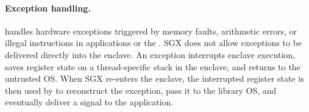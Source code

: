




\paragraph{Exception handling.}
\graphenesgx{} handles hardware exceptions triggered by memory faults, arithmetic errors, or illegal instructions in applications or the \libos{}.
SGX does not allow exceptions to be delivered directly into the enclave.
An exception interrupts enclave execution, 
saves register state on a thread-specific stack in the enclave,
and returns to the untrusted OS.
When SGX re-enters the enclave, the interrupted register state
is then used by
\graphenesgx{} to reconstruct the exception, pass it to the library OS, and eventually deliver a signal to the application.



